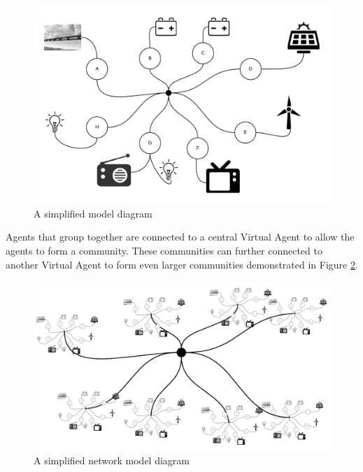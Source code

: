 \clearpage
\begin{figure}[h!]
	\centering
	\includegraphics[scale=0.8]{Images/Model.png}
	\caption{A simplified model diagram}
	\label{fig:SimpleModel}
\end{figure}

Agents that group together are connected to a central Virtual Agent to allow the agents to form a community. These communities can further connected to another Virtual Agent to form even larger communities demonstrated in Figure \ref{fig:SimpleModel2}. 

\begin{figure}[h!]
	\centering
	\includegraphics[scale = 0.9]{Images/Model2.png}
	\caption{A simplified network model diagram}
	\label{fig:SimpleModel2}
\end{figure}

